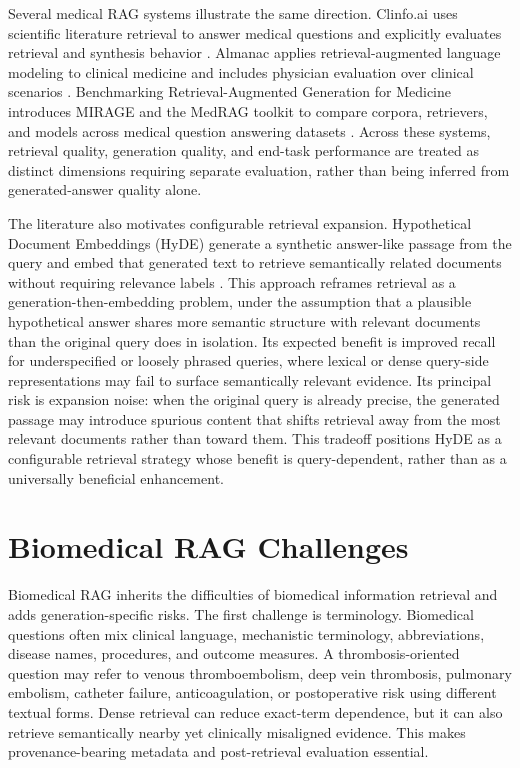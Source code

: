 Several medical RAG systems illustrate the same direction. Clinfo.ai uses scientific literature retrieval to answer medical questions and explicitly evaluates retrieval and synthesis behavior \cite{lozano2024clinfo}. Almanac applies retrieval-augmented language modeling to clinical medicine and includes physician evaluation over clinical scenarios \cite{zakka2024almanac}. Benchmarking Retrieval-Augmented Generation for Medicine introduces MIRAGE and the MedRAG toolkit to compare corpora, retrievers, and models across medical question answering datasets \cite{xiong2024benchmarking}. Across these systems, retrieval quality, generation quality, and end-task performance are treated as distinct dimensions requiring separate evaluation, rather than being inferred from generated-answer quality alone.

The literature also motivates configurable retrieval expansion. Hypothetical Document Embeddings (HyDE) generate a synthetic answer-like passage from the query and embed that generated text to retrieve semantically related documents without requiring relevance labels \cite{gao2023hyde}. This approach reframes retrieval as a generation-then-embedding problem, under the assumption that a plausible hypothetical answer shares more semantic structure with relevant documents than the original query does in isolation. Its expected benefit is improved recall for underspecified or loosely phrased queries, where lexical or dense query-side representations may fail to surface semantically relevant evidence. Its principal risk is expansion noise: when the original query is already precise, the generated passage may introduce spurious content that shifts retrieval away from the most relevant documents rather than toward them. This tradeoff positions HyDE as a configurable retrieval strategy whose benefit is query-dependent, rather than as a universally beneficial enhancement.

\section{Biomedical RAG Challenges}

Biomedical RAG inherits the difficulties of biomedical information retrieval and adds generation-specific risks. The first challenge is terminology. Biomedical questions often mix clinical language, mechanistic terminology, abbreviations, disease names, procedures, and outcome measures. A thrombosis-oriented question may refer to venous thromboembolism, deep vein thrombosis, pulmonary embolism, catheter failure, anticoagulation, or postoperative risk using different textual forms. Dense retrieval can reduce exact-term dependence, but it can also retrieve semantically nearby yet clinically misaligned evidence. This makes provenance-bearing metadata and post-retrieval evaluation essential.

